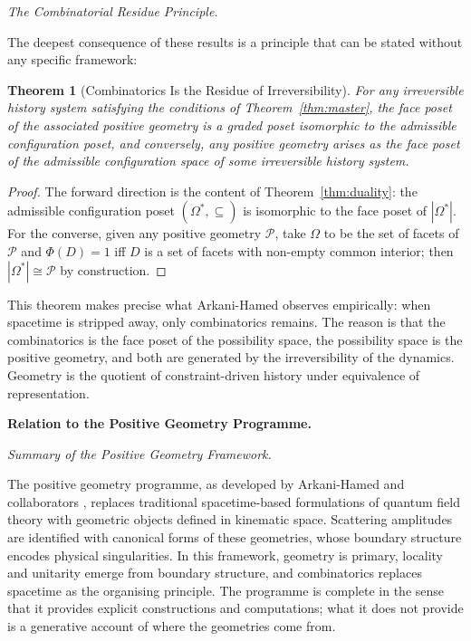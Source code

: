 \documentclass[12pt, oneside]{amsart}
\theoremstyle{plain}
\newtheorem{theorem}{Theorem}[section]
\theoremstyle{definition}
\theoremstyle{remark}
\newcommand{\Phif}{\Phi}
\newcommand{\OmKS}{\Omega}
\begin{document}
\medskip\noindent\textit{The Combinatorial Residue Principle.}

The deepest consequence of these results is a principle that can be stated without any specific framework:

\begin{theorem}[Combinatorics Is the Residue of Irreversibility]
For any irreversible history system satisfying the conditions of Theorem~\ref{thm:master}, the face poset of the associated positive geometry is a graded poset isomorphic to the admissible configuration poset, and conversely, any positive geometry arises as the face poset of the admissible configuration space of some irreversible history system.
\end{theorem}

\begin{proof}
The forward direction is the content of Theorem~\ref{thm:duality}: the admissible configuration poset $(\OmKS^*, \subseteq)$ is isomorphic to the face poset of $|\OmKS^*|$. For the converse, given any positive geometry $\mathcal{P}$, take $\OmKS$ to be the set of facets of $\mathcal{P}$ and $\Phif(D) = 1$ iff $D$ is a set of facets with non-empty common interior; then $|\OmKS^*| \cong \mathcal{P}$ by construction.
\end{proof}

This theorem makes precise what Arkani-Hamed observes empirically: when spacetime is stripped away, only combinatorics remains. The reason is that the combinatorics is the face poset of the possibility space, the possibility space is the positive geometry, and both are generated by the irreversibility of the dynamics. Geometry is the quotient of constraint-driven history under equivalence of representation.

\bigskip\noindent\textbf{Relation to the Positive Geometry Programme.}
\label{sec:relation}

\medskip\noindent\textit{Summary of the Positive Geometry Framework.}

The positive geometry programme, as developed by Arkani-Hamed and collaborators \cite{ArkaniHamed2017, ArkaniHamed2014, ArkaniHamed2012}, replaces traditional spacetime-based formulations of quantum field theory with geometric objects defined in kinematic space. Scattering amplitudes are identified with canonical forms of these geometries, whose boundary structure encodes physical singularities. In this framework, geometry is primary, locality and unitarity emerge from boundary structure, and combinatorics replaces spacetime as the organising principle. The programme is complete in the sense that it provides explicit constructions and computations; what it does not provide is a generative account of where the geometries come from.
\end{document}
